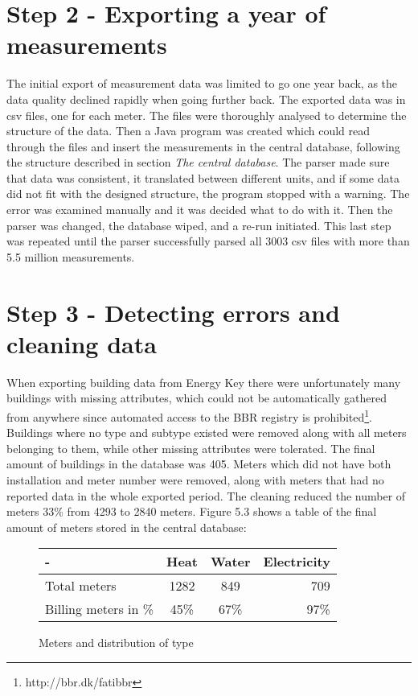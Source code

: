 \section*{Step 2 - Exporting a year of measurements}
The initial export of measurement data was limited to go one year back, as the data quality declined rapidly when going further back. The exported data was in csv files, one for each meter. The files were thoroughly analysed to determine the structure of the data. Then a Java program was created which could read through the files and insert the measurements in the central database, following the structure described in section \emph{The central database}. The parser made sure that data was consistent, it translated between different units, and if some data did not fit with the designed structure, the program stopped with a warning. The error was examined manually and it was decided what to do with it. Then the parser was changed, the database wiped, and a re-run initiated. This last step was repeated until the parser successfully parsed all 3003 csv files with more than 5.5 million measurements. 
\section*{Step 3 - Detecting errors and cleaning data}
When exporting building data from Energy Key there were unfortunately many buildings with missing attributes, which could not be automatically gathered from anywhere since automated access to the BBR registry is prohibited\footnote{http://bbr.dk/fatibbr}.  Buildings where no type and subtype existed were removed along with all meters belonging to them, while other missing attributes were tolerated. The final amount of buildings in the database was 405. Meters which did not have both installation and meter number were removed, along with meters that had no reported data in the whole exported period. The cleaning reduced the number of meters 33\% from 4293 to 2840 meters. Figure 5.3 shows a table of the final amount of meters stored in the central database:
\begin{figure}
\begin{center}
\begin{tabular}{| l | c | c | r |}
\hline 
  - & Heat & Water & Electricity \\ \hline 
  Total meters & 1282 & 849 & 709 \\ \hline 
  Billing meters in \% & 45\% & 67\% & 97\% \\ \hline
\end{tabular}
\end{center}
\caption{Meters and distribution of type}
\end{figure}

